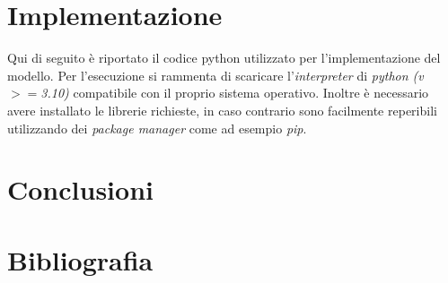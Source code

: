\documentclass{article}
\begin{document}
\section{Implementazione}
\label{Sec:5}
Qui di seguito è riportato il codice python utilizzato per l'implementazione del modello. Per l'esecuzione si rammenta di scaricare l'\textit{interpreter} di \textit{python (v ${>=}$3.10)} compatibile con il proprio sistema operativo. Inoltre è necessario avere installato le librerie richieste, in caso contrario sono facilmente reperibili utilizzando dei \textit{package manager} come ad esempio \textit{pip}.

\section{Conclusioni}
\label{Sec:6}

\section{Bibliografia}
\label{Sec:7}
\end{document}
